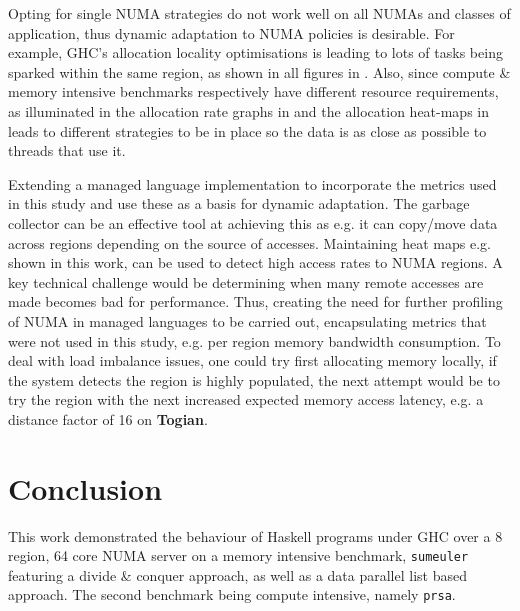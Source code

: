 \documentclass{paper}\usepackage{graphicx}
\begin{document}
Opting for single NUMA strategies do not work well on all NUMAs and classes of application, thus dynamic adaptation to NUMA policies is desirable. For example, GHC's allocation locality optimisations is leading to lots of tasks being sparked within the same region, as shown in all figures in . Also, since compute \& memory intensive benchmarks respectively have different resource requirements, as illuminated in the allocation rate graphs in  and the allocation heat-maps in  leads to different strategies to be in place so the data is as close as possible to threads that use it.

Extending a managed language implementation to incorporate the metrics used in this study and use these as a basis for dynamic adaptation. The garbage collector can be an effective tool at achieving this as e.g. it can copy/move data across regions depending on the source of accesses. Maintaining heat maps e.g. shown in this work, can be used to detect high access rates to NUMA regions. A key technical challenge would be determining when many remote accesses are made becomes bad for performance. Thus, creating the need for further profiling of NUMA in managed languages to be carried out, encapsulating metrics that were not used in this study, e.g. per region memory bandwidth consumption. To deal with load imbalance issues, one could try first allocating memory locally, if the system detects the region is highly populated, the next attempt would be to try the region with the next increased expected memory access latency, e.g. a distance factor of 16 on \textbf{Togian}.

\section{Conclusion}
\label{sec:conclusion}

This work demonstrated the behaviour of Haskell programs under GHC over a 8 region, 64 core NUMA server on a memory intensive benchmark, \lstinline{sumeuler} featuring a divide \& conquer approach, as well as a data parallel list based approach. The second benchmark being compute intensive, namely \lstinline{prsa}.
\end{document}
